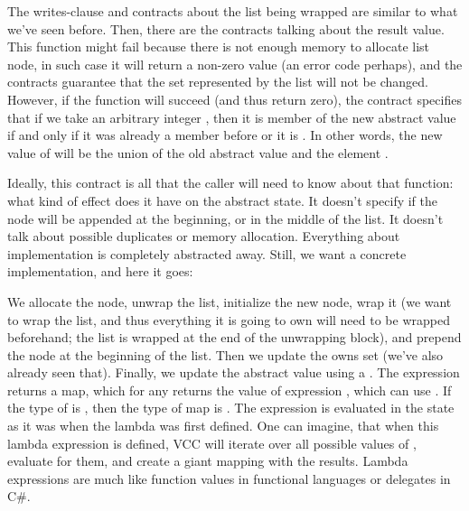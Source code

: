 
\noindent
The writes-clause and contracts about the list being wrapped are similar to what
we've seen before.
Then, there are the contracts talking about the result value.
This function might fail because there is not enough memory to allocate list node,
in such case it will return a non-zero value (an error code perhaps),
and the contracts guarantee that the set represented by the list will not be changed.
However, if the function will succeed (and thus return zero), the contract specifies
that if we take an arbitrary integer , then it is member of the new abstract
value if and only if it was already a member before or it is .
In other words, the new value of  will be the union of the old
abstract value and the element .

Ideally, this contract is all that the caller will need to know about that function:
what kind of effect does it have on the abstract state. 
It doesn't specify if the node will be appended at the beginning, or in the middle
of the list.
It doesn't talk about possible duplicates or memory allocation.
Everything about implementation is completely abstracted away.
Still, we want a concrete implementation, and here it goes:


\noindent
We allocate the node, unwrap the list, initialize the new node,
wrap it (we want to wrap the list, and thus everything it is going to own will
need to be wrapped beforehand; the list is wrapped at the end of the 
unwrapping block), and
prepend the node at the beginning of the list.
Then we update the owns set (we've also already seen that).
Finally, we update the abstract value using a .
The expression  returns a map, which for
any  returns the value of expression ,
which can use .
If the type of  is , then the type of map is .
The expression is evaluated in the state as it was
when the lambda was first defined.
One can imagine, that when this lambda expression is defined,
VCC will iterate over all possible values of ,
evaluate  for them, and create a giant mapping
with the results.
Lambda expressions are much like function values in functional
languages or delegates in C\#.

